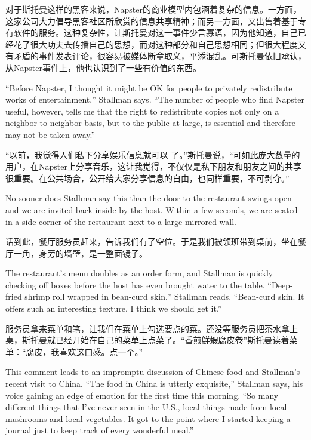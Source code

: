 \ifdefined\chs
对于斯托曼这样的黑客来说，Napster的商业模型内包涵着复杂的信息。一方面，这家公司大力倡导黑客社区所欣赏的信息共享精神；而另一方面，又出售着基于专有软件的服务。这种复杂性，让斯托曼对这一事件少言寡语，因为他知道，自己已经花了很大功夫去传播自己的思想，而对这种部分和自己思想相同；但很大程度又有矛盾的事件发表评论，很容易被媒体断章取义，平添混乱。可斯托曼依旧承认，从Napster事件上，他也认识到了一些有价值的东西。
\fi

\ifdefined\eng
``Before Napster, I thought it might be \ifdefined\vone OK \fi\ifdefined\vtwo [sufficient] \fi for people to privately redistribute works of entertainment,'' Stallman says. ``The number of people who find Napster useful, however, tells me that the right to redistribute copies not only on a neighbor-to-neighbor basis, but to the public at large, is essential and therefore may not be taken away.''
\fi

\ifdefined\chs
``以前，我觉得人们私下分享娱乐信息就\ifdefined\vone 可以 \fi\ifdefined\vtwo [足够]\fi 了。''斯托曼说，``可如此庞大数量的用户，在Napster上分享音乐，这让我觉得，不仅仅是私下朋友和朋友之间的共享很重要。在公共场合，公开给大家分享信息的自由，也同样重要，不可剥夺。''
\fi

\ifdefined\eng
No sooner does Stallman say this than the door to the restaurant swings open and we are invited back inside by the host. Within a few seconds, we are seated in a side corner of the restaurant next to a large mirrored wall.
\fi

\ifdefined\chs
话到此，餐厅服务员赶来，告诉我们有了空位。于是我们被领班带到桌前，坐在餐厅一角，身旁的墙壁，是一整面镜子。
\fi

\ifdefined\eng
The restaurant's menu doubles as an order form, and Stallman is quickly checking off boxes before the host has even brought water to the table. ``Deep-fried shrimp roll wrapped in bean-curd skin,'' Stallman reads. ``Bean-curd skin. It offers such an interesting texture. I think we should get it.''
\fi

\ifdefined\chs
服务员拿来菜单和笔，让我们在菜单上勾选要点的菜。还没等服务员把茶水拿上桌，斯托曼就已经开始在自己的菜单上点菜了。``香煎鮮蝦腐皮卷''斯托曼读着菜单：``腐皮，我喜欢这口感。点一个。''
\fi

\ifdefined\eng
This comment leads to an impromptu discussion of Chinese food and Stallman's recent visit to China. ``The food in China is utterly exquisite,'' Stallman says, his voice gaining an edge of emotion for the first time this morning. ``So many different things that I've never seen in the U.S., local things made from local mushrooms and local vegetables. It got to the point where I started keeping a journal just to keep track of every wonderful meal.''
\fi

